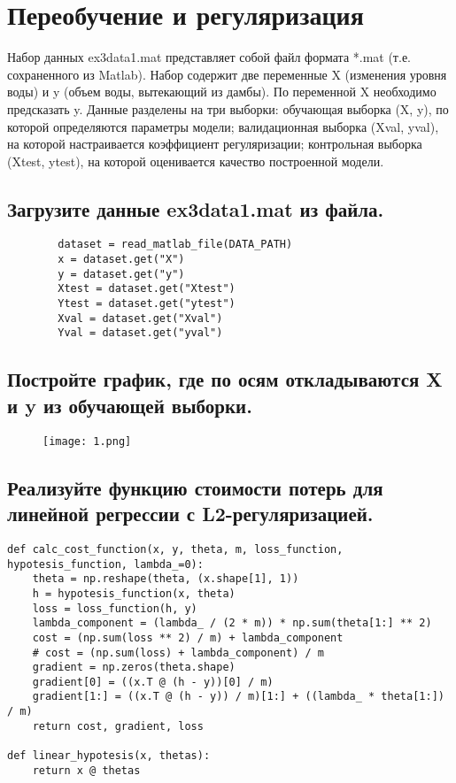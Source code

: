 







\section{Переобучение и регуляризация}
\label{sec:purpose}

Набор данных ex3data1.mat представляет собой файл формата *.mat (т.е. сохраненного из Matlab). Набор содержит две переменные X (изменения уровня воды) и y (объем воды, вытекающий из дамбы). По переменной X необходимо предсказать y. Данные разделены на три выборки: обучающая выборка (X, y), по которой определяются параметры модели; валидационная выборка (Xval, yval), на которой настраивается коэффициент регуляризации; контрольная выборка (Xtest, ytest), на которой оценивается качество построенной модели.

\subsection{Загрузите данные ex3data1.mat из файла.}

\begin{lstlisting}
        dataset = read_matlab_file(DATA_PATH)
        x = dataset.get("X")
        y = dataset.get("y")
        Xtest = dataset.get("Xtest")
        Ytest = dataset.get("ytest")
        Xval = dataset.get("Xval")
        Yval = dataset.get("yval")
\end{lstlisting}

\subsection{Постройте график, где по осям откладываются X и y из обучающей выборки.}

\begin{figure}[h]
\centering
	\texttt{[image: 1.png]}
	\label{sec:purpose:payings}
\end{figure}

\subsection{Реализуйте функцию стоимости потерь для линейной регрессии с L2-регуляризацией.}

\begin{lstlisting}
def calc_cost_function(x, y, theta, m, loss_function, hypotesis_function, lambda_=0):
    theta = np.reshape(theta, (x.shape[1], 1))
    h = hypotesis_function(x, theta)
    loss = loss_function(h, y)
    lambda_component = (lambda_ / (2 * m)) * np.sum(theta[1:] ** 2)
    cost = (np.sum(loss ** 2) / m) + lambda_component
    # cost = (np.sum(loss) + lambda_component) / m
    gradient = np.zeros(theta.shape)
    gradient[0] = ((x.T @ (h - y))[0] / m)
    gradient[1:] = ((x.T @ (h - y)) / m)[1:] + ((lambda_ * theta[1:]) / m)
    return cost, gradient, loss

def linear_hypotesis(x, thetas):
    return x @ thetas
\end{lstlisting}

